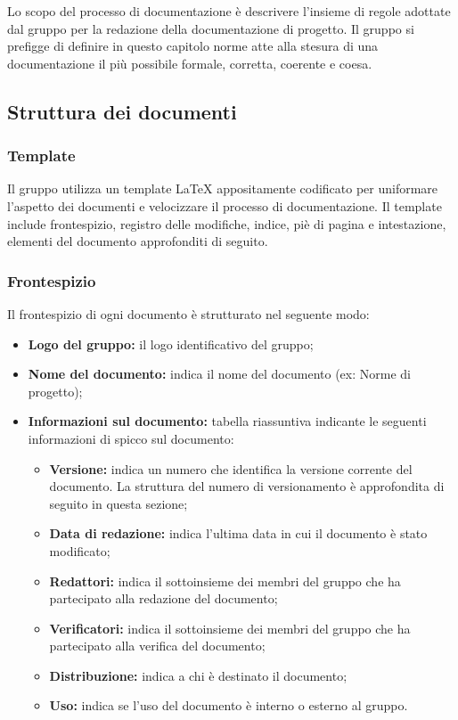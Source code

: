\documentclass[../NormediProgetto.tex]{subfiles}
\begin{document}
Lo scopo del processo di documentazione è descrivere l'insieme di regole adottate dal gruppo per la redazione della documentazione di progetto. Il gruppo si prefigge di definire in questo capitolo norme atte alla stesura di una documentazione il più possibile formale, corretta, coerente e coesa.


\subsection{Struttura dei documenti}

\subsubsection{Template}

Il gruppo utilizza un template \LaTeX{} appositamente codificato per uniformare l'aspetto dei documenti e velocizzare il processo di documentazione. Il template include frontespizio, registro delle modifiche, indice, piè di pagina e intestazione, elementi del documento approfonditi di seguito. 

\subsubsection{Frontespizio}

Il frontespizio di ogni documento è strutturato nel seguente modo:

\begin{itemize}
    \item \textbf{Logo del gruppo:} il logo identificativo del gruppo;
    \item \textbf{Nome del documento:} indica il nome del documento (ex: Norme di progetto);
    \item \textbf{Informazioni sul documento:} tabella riassuntiva indicante le seguenti informazioni di spicco sul documento:
        \begin{itemize}
            \item \textbf{Versione:} indica un numero che identifica la versione corrente del documento. La struttura del numero di versionamento è approfondita di seguito in questa sezione;
            \item \textbf{Data di redazione:} indica l'ultima data in cui il documento è stato modificato;
            \item \textbf{Redattori:} indica il sottoinsieme dei membri del gruppo che ha partecipato alla redazione del documento;
            \item \textbf{Verificatori:} indica il sottoinsieme dei membri del gruppo che ha partecipato alla verifica del documento;
            \item \textbf{Distribuzione:} indica a chi è destinato il documento;
            \item \textbf{Uso:} indica se l'uso del documento è interno o esterno al gruppo.
        \end{itemize}
        
\end{itemize}
\end{document}

